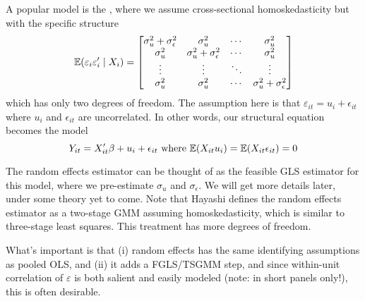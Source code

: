 \documentclass[10pt]{article}
\begin{document}
\begin{definition}
	A popular model is the , where we assume cross-sectional homoskedasticity but with the specific structure \[\mathbb{E}(\varepsilon_i\varepsilon_i' \mid X_i) = \begin{bmatrix}\sigma_u^2 + \sigma_\epsilon^2 & \sigma_u^2 & \cdots & \sigma_u^2 \\ \sigma_u^2 & \sigma_u^2 + \sigma_\epsilon^2 & \cdots & \sigma_u^2 \\\vdots & \vdots & \ddots & \vdots \\ \sigma_u^2 & \sigma_u^2 & \cdots & \sigma_u^2 + \sigma_\epsilon^2\end{bmatrix}\]which has only two degrees of freedom. The assumption here is that $\varepsilon_{it} = u_i + \epsilon_{it}$ where $u_i$ and $\epsilon_{it}$ are uncorrelated. In other words, our structural equation becomes the model \[Y_{it} = X'_{it} \beta + u_i + \epsilon_{it} \text{ where } \mathbb{E}(X_{it}u_i) = \mathbb{E}(X_{it}\epsilon_{it}) = 0\]
\end{definition}
\begin{remark}
	The random effects estimator can be thought of as the feasible GLS estimator for this model, where we pre-estimate $\sigma_u$ and $\sigma_\epsilon$. We will get more details later, under some theory yet to come. Note that Hayashi defines the random effects estimator as a two-stage GMM assuming homoskedasticity, which is similar to three-stage least squares. This treatment has more degrees of freedom.  
\end{remark}
What's important is that (i) random effects has the same identifying assumptions as pooled OLS, and (ii) it adds a FGLS/TSGMM step, and since within-unit correlation of $\varepsilon$ is both salient and easily modeled (note: in short panels only!), this is often desirable.
\end{document}
